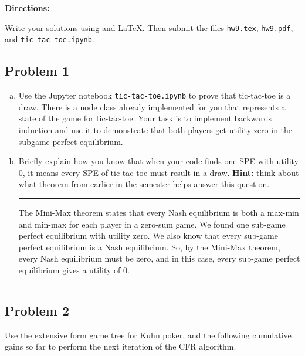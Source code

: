 \documentclass[11pt]{article}
\newcommand{\titlebox}[3]{
    \begin{center}
        \framebox{
            \vbox{
            \hbox to \textwidth { #1 \hfill #3}
            \vspace{-4mm}
            \hbox to \textwidth {\hfill \Large \bf #2 \hfill}
        }
    }
    \end{center}
}
\newcommand{\answer}[1]{
\vspace{.5\baselineskip} \hrule \vspace{.5\baselineskip}
#1
\vspace{.5\baselineskip} \hrule \vspace{.5\baselineskip}
}
\begin{document}
\titlebox{CSC 383, S'23}
{Homework 9}
{Due May \nth{3}}

\textbf{Directions:}

Write your solutions using and \LaTeX.
Then submit the files \texttt{hw9.tex}, \texttt{hw9.pdf}, and \texttt{tic-tac-toe.ipynb}.





\subsection*{Problem 1}

\begin{enumerate}[(a)]

\item
Use the Jupyter notebook \texttt{tic-tac-toe.ipynb} to prove that tic-tac-toe is a draw.
There is a node class already implemented for you that represents a state of the game for tic-tac-toe.
Your task is to implement backwards induction and use it to demonstrate that both players get utility zero in the subgame perfect equilibrium.

\item
Briefly explain how you know that when your code finds one SPE with utility 0, it means every SPE of tic-tac-toe must result in a draw.
\textbf{Hint:} think about what theorem from earlier in the semester helps answer this question.

\answer{

The Mini-Max theorem states that every Nash equilibrium is both a max-min and min-max for each player in a zero-sum game.  We found one sub-game perfect equilibrium with utility zero.  We also know that every sub-game perfect equilibrium is a Nash equilibrium.  So, by the Mini-Max theorem, every Nash equilibrium must be zero, and in this case, every sub-game perfect equilibrium gives a utility of 0.

}

\end{enumerate}



\subsection*{Problem 2}

Use the extensive form game tree for Kuhn poker, and the following cumulative gains so far to perform the next iteration of the CFR algorithm.
\end{document}
